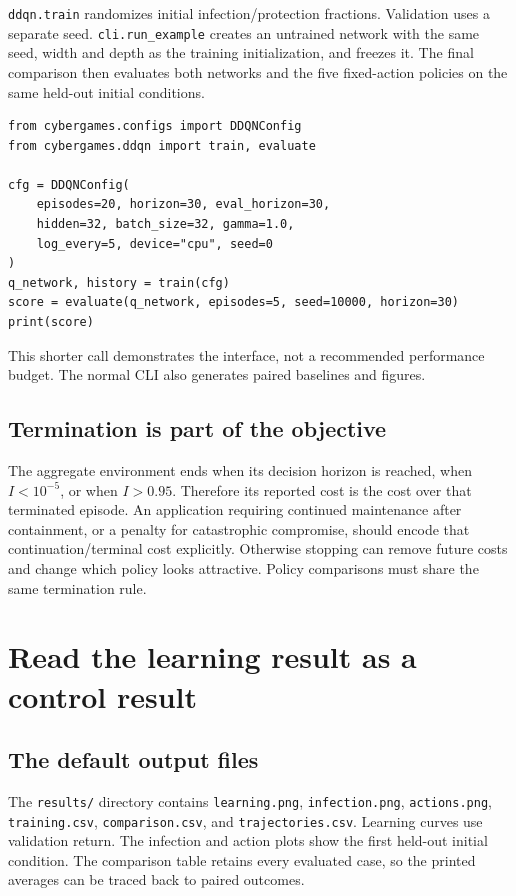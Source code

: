 \documentclass[11pt,a4paper]{article}
\theoremstyle{definition}
\theoremstyle{remark}
\begin{document}
\texttt{ddqn.train} randomizes initial infection/protection fractions. Validation uses a separate seed. \texttt{cli.run\_example} creates an untrained network with the same seed, width and depth as the training initialization, and freezes it. The final comparison then evaluates both networks and the five fixed-action policies on the same held-out initial conditions.

\begin{lstlisting}[caption={A small training call using the repository API}]
from cybergames.configs import DDQNConfig
from cybergames.ddqn import train, evaluate

cfg = DDQNConfig(
    episodes=20, horizon=30, eval_horizon=30,
    hidden=32, batch_size=32, gamma=1.0,
    log_every=5, device="cpu", seed=0
)
q_network, history = train(cfg)
score = evaluate(q_network, episodes=5, seed=10000, horizon=30)
print(score)
\end{lstlisting}
This shorter call demonstrates the interface, not a recommended performance budget. The normal CLI also generates paired baselines and figures.

\subsection{Termination is part of the objective}
The aggregate environment ends when its decision horizon is reached, when $I<10^{-5}$, or when $I>0.95$. Therefore its reported cost is the cost over that terminated episode. An application requiring continued maintenance after containment, or a penalty for catastrophic compromise, should encode that continuation/terminal cost explicitly. Otherwise stopping can remove future costs and change which policy looks attractive. Policy comparisons must share the same termination rule.

\section{Read the learning result as a control result}
\subsection{The default output files}
The \texttt{results/} directory contains \texttt{learning.png}, \texttt{infection.png}, \texttt{actions.png}, \texttt{training.csv}, \texttt{comparison.csv}, and \texttt{trajectories.csv}. Learning curves use validation return. The infection and action plots show the first held-out initial condition. The comparison table retains every evaluated case, so the printed averages can be traced back to paired outcomes.
\end{document}
